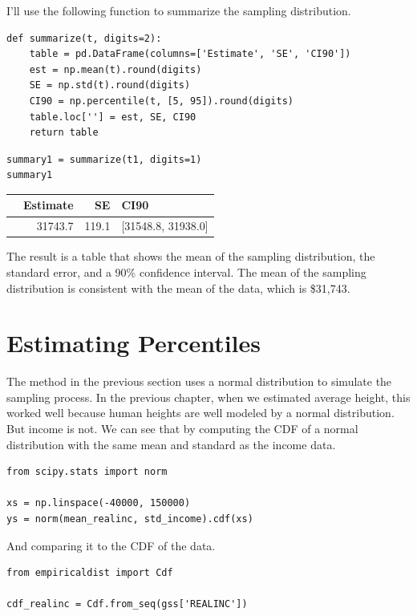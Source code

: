 I'll use the following function to summarize the sampling distribution.

\begin{lstlisting}[]
def summarize(t, digits=2):
    table = pd.DataFrame(columns=['Estimate', 'SE', 'CI90'])
    est = np.mean(t).round(digits)
    SE = np.std(t).round(digits)
    CI90 = np.percentile(t, [5, 95]).round(digits)
    table.loc[''] = est, SE, CI90
    return table
\end{lstlisting}

\begin{lstlisting}[]
summary1 = summarize(t1, digits=1)
summary1
\end{lstlisting}

\begin{tabular}{lrrl}
\midrule
{} &  Estimate &     SE &                CI90 \\
\midrule
{} &   31743.7 &  119.1 &  [31548.8, 31938.0] \\
\midrule
\end{tabular}

The result is a table that shows the mean of the sampling distribution,
the standard error, and a 90\% confidence interval. The mean of the
sampling distribution is consistent with the mean of the data, which is
\$31,743.

\hypertarget{estimating-percentiles}{%
\section{Estimating Percentiles}\label{estimating-percentiles}}

The method in the previous section uses a normal distribution to
simulate the sampling process. In the previous chapter, when we
estimated average height, this worked well because human heights are
well modeled by a normal distribution. But income is not. We can see
that by computing the CDF of a normal distribution with the same mean
and standard as the income data.

\begin{lstlisting}[]
from scipy.stats import norm

xs = np.linspace(-40000, 150000)
ys = norm(mean_realinc, std_income).cdf(xs)
\end{lstlisting}

And comparing it to the CDF of the data.

\begin{lstlisting}[]
from empiricaldist import Cdf

cdf_realinc = Cdf.from_seq(gss['REALINC'])
\end{lstlisting}

